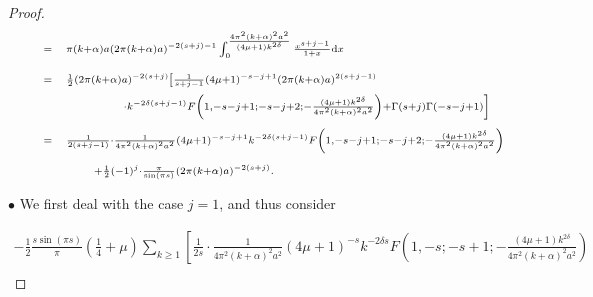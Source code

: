 \documentclass{jams-l}
\theoremstyle{definition}
\theoremstyle{remark}
\numberwithin{equation}{section}
\begin{document}
\begin{proof}
\[\begin{array}{lllll}
                            \quad & \scriptstyle = & \multicolumn{3}{l}{\scriptstyle \pi \left( k + \alpha \right) a \left( 2 \pi \left( k + \alpha \right) a \right)^{-2 \left( s+j \right) - 1} \int_0^{\frac{4 \pi^2 \left( k + \alpha \right)^2 a^2}{\left( 4 \mu + 1 \right)k^{2 \delta}}} \frac{x^{s+j-1}}{1+x} \mathrm{d}x} \\[1em]
                            
                            & \scriptstyle = & \multicolumn{3}{l}{\scriptstyle \frac{1}{2} \left( 2 \pi \left( k + \alpha \right) a \right)^{- 2 \left( s + j \right)} \left[ \frac{1}{s + j - 1} \left( 4 \mu + 1 \right)^{-s-j+1} \left( 2 \pi \left( k + \alpha \right) a \right)^{2 \left( s + j - 1 \right)} \right.} \\[0.5em]
                            
                            && \multicolumn{3}{l}{\scriptstyle \qquad \qquad \left. \cdot k^{- 2 \delta \left( s+j-1 \right)} F \left( 1, -s-j+1; -s-j+2; - \frac{\left( 4 \mu + 1 \right) k^{2 \delta}}{4 \pi^2 \left( k + \alpha \right)^2 a^2} \right) + \Gamma \left( s+j \right) \Gamma \left( -s-j+1 \right) \right]} \\[1em]
                            
                            & \scriptstyle = & \multicolumn{3}{l}{\scriptstyle \frac{1}{2 \left( s + j - 1 \right)} \cdot \frac{1}{4 \pi^2 \left( k + \alpha \right)^2 a^2} \left( 4 \mu + 1 \right)^{-s-j+1} k^{- 2 \delta \left( s+j-1 \right)} F \left( 1, -s-j+1; -s-j+2; - \frac{\left( 4 \mu + 1 \right) k^{2 \delta}}{4 \pi^2 \left( k + \alpha \right)^2 a^2} \right)} \\[1em]
                            
                            && \multicolumn{3}{l}{\scriptstyle \qquad + \frac{1}{2} \left( -1 \right)^j \cdot \frac{\pi}{\sin \left( \pi s \right)} \left( 2 \pi \left( k + \alpha \right) a \right)^{-2 \left( s+j \right)}.}
                        \end{array} \]
                    
                    \bigskip
                    
                    
                    \hspace{0.5cm} $\bullet$ We first deal with the case $j = 1$, and thus consider
                    
                        \begin{equation}
                        \label{EqMTildePart3TermJ1}
                            \begin{array}{l}
                                \scriptstyle - \frac{1}{2} \frac{s \sin \left( \pi s \right)}{\pi} \left( \frac{1}{4} + \mu \right) \sum\limits_{k \geqslant 1} \left[ \frac{1}{2s} \cdot \frac{1}{4 \pi^2 \left( k + \alpha \right)^2 a^2} \left( 4 \mu + 1 \right)^{-s} k^{-2 \delta s} F \left( 1, -s; -s+1; - \frac{\left( 4 \mu + 1 \right) k^{2 \delta}}{4 \pi^2 \left( k + \alpha \right)^2 a^2} \right) \right. \\[1em]
                                

\end{array}
\end{equation}
\end{proof}
\end{document}
